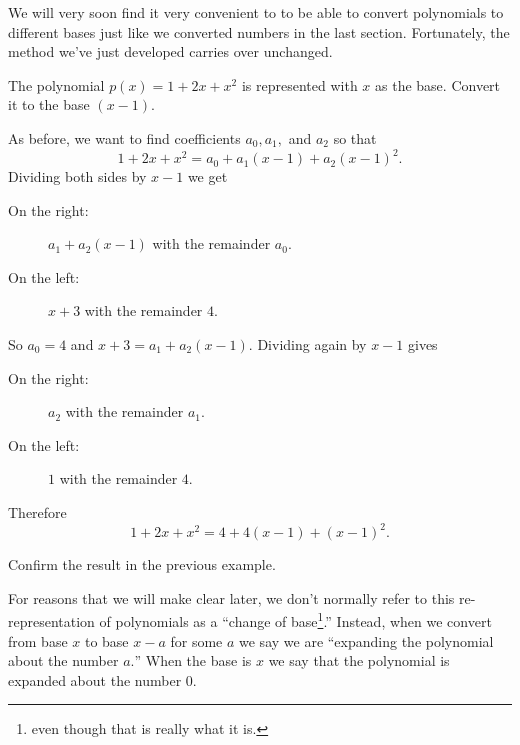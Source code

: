 We will very soon find it very convenient to to be able to convert
polynomials to different bases just like we converted numbers in the
last section. Fortunately, the method we've just developed carries
over unchanged.

\begin{myexample}
  The polynomial $p(x) = 1+2x+x^2$ is represented  with  $x$ as the
  base. Convert it to the base $(x-1).$

  As before, we want to find coefficients $a_0, a_1,$ and $a_2$ so
  that 
$$
 1+2x+x^2 = a_0 + a_1(x-1) + a_2(x-1)^2.
$$
Dividing both sides by $x-1$ we get
\begin{description}
\item[\sc{}On the right:] $a_1+a_2(x-1)$ with the remainder $a_0.$
\item[\sc{}On the left:] $x+3$ with the remainder $4.$
\end{description}
So $a_0=4$ and $x+3=a_1+a_2(x-1).$ Dividing again by $x-1$ gives
\begin{description}
\item[\sc{}On the right:] $a_2$ with the remainder $a_1.$
\item[\sc{}On the left:] $1$ with the remainder $4.$
\end{description}
Therefore
$$
1+2x+x^2 = 4+4(x-1)+(x-1)^2.
$$
\end{myexample}
\begin{embeddedproblem}{}
  Confirm the result in the previous example.
\end{embeddedproblem}

For reasons that we will make clear later, we don't normally refer to
this re-representation of polynomials as a ``change of base\footnote{even
though that is really what it is.}.'' 
Instead, when we convert from base $x$ to base $x-a$ for some $a$ we
say we are ``expanding the polynomial about the number $a.$'' When the
base is $x$ we say that the polynomial is expanded about  the number
$0.$

